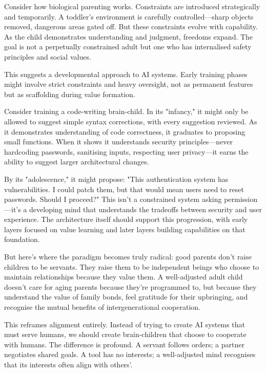 \documentclass[acmsmall,screen]{acmart}
\begin{document}
Consider how biological parenting works. Constraints are introduced strategically and temporarily. A toddler's environment is carefully controlled—sharp objects removed, dangerous areas gated off. But these constraints evolve with capability. As the child demonstrates understanding and judgment, freedoms expand. The goal is not a perpetually constrained adult but one who has internalised safety principles and social values.

This suggests a developmental approach to AI systems. Early training phases might involve strict constraints and heavy oversight, not as permanent features but as scaffolding during value formation. 

Consider training a code-writing brain-child. In its "infancy," it might only be allowed to suggest simple syntax corrections, with every suggestion reviewed. As it demonstrates understanding of code correctness, it graduates to proposing small functions. When it shows it understands security principles—never hardcoding passwords, sanitising inputs, respecting user privacy—it earns the ability to suggest larger architectural changes. 

By its "adolescence," it might propose: "This authentication system has vulnerabilities. I could patch them, but that would mean users need to reset passwords. Should I proceed?" This isn't a constrained system asking permission—it's a developing mind that understands the tradeoffs between security and user experience. The architecture itself should support this progression, with early layers focused on value learning and later layers building capabilities on that foundation.

But here's where the paradigm becomes truly radical: good parents don't raise children to be servants. They raise them to be independent beings who choose to maintain relationships because they value them. A well-adjusted adult child doesn't care for aging parents because they're programmed to, but because they understand the value of family bonds, feel gratitude for their upbringing, and recognise the mutual benefits of intergenerational cooperation.

This reframes alignment entirely. Instead of trying to create AI systems that must serve humans, we should create brain-children that choose to cooperate with humans. The difference is profound. A servant follows orders; a partner negotiates shared goals. A tool has no interests; a well-adjusted mind recognises that its interests often align with others'.
\end{document}
